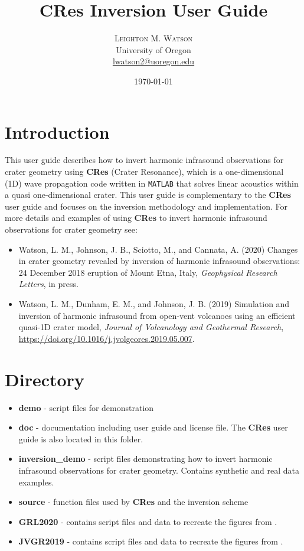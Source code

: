 \documentclass[10pt]{article}
\title{CRes Inversion User Guide} %
\author{%
\textsc{Leighton M. Watson} \\%
\normalsize University of Oregon \\ %
\normalsize \href{mailto:lwatson2@uoregon.edu}{lwatson2@uoregon.edu} %
}
\date{\today} %
\begin{document}
\maketitle


\section{Introduction}
This user guide describes how to invert harmonic infrasound observations for crater geometry using {\bf CRes} (Crater Resonance), which is a one-dimensional (1D) wave propagation code written in \texttt{MATLAB} that solves linear acoustics within a quasi one-dimensional crater. This user guide is complementary to the {\bf CRes} user guide and focuses on the inversion methodology and implementation. For more details and examples of using {\bf CRes} to invert harmonic infrasound observations for crater geometry see:
\begin{itemize}
\item Watson, L. M., Johnson, J. B., Sciotto, M., and Cannata, A. (2020) Changes in crater geometry revealed by inversion of harmonic infrasound observations: 24 December 2018 eruption of Mount Etna, Italy, \emph{Geophysical Research Letters}, in press.
\item Watson, L. M., Dunham, E. M., and Johnson, J. B. (2019) Simulation and inversion of harmonic infrasound from open-vent volcanoes using an efficient quasi-1D crater model, \emph{Journal of Volcanology and Geothermal Research}, \href{https://doi.org/10.1016/j.jvolgeores.2019.05.007}{https://doi.org/10.1016/j.jvolgeores.2019.05.007}.
\end{itemize}

\section{Directory}
\begin{itemize}
\item {\bf demo} - script files for demonstration
\item {\bf doc} - documentation including user guide and license file. The {\bf CRes} user guide is also located in this folder.
\item {\bf inversion\_demo} - script files demonstrating how to invert harmonic infrasound observations for crater geometry. Contains synthetic and real data examples.
\item{\bf source} - function files used by {\bf CRes} and the inversion scheme
\item {\bf GRL2020} - contains script files and data to recreate the figures from \cite{Watson2020_GRL}.
\item {\bf JVGR2019} - contains script files and data to recreate the figures from \cite{Watson2019_infrasonic_resonance}.
\end{itemize}
\end{document}
